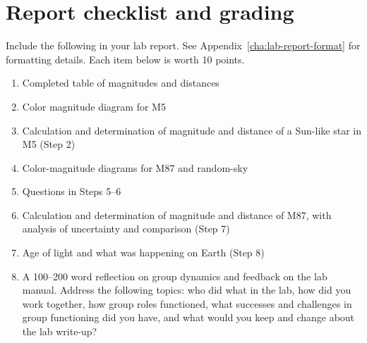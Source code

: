 \section{Report checklist and grading}

Include the following in your lab report. See Appendix~\ref{cha:lab-report-format} for formatting details. Each item below is worth 10 points.

\begin{enumerate}
	\item Completed table of magnitudes and distances
	
	\item Color magnitude diagram for M5
	
	\item Calculation and determination of magnitude and distance of a Sun-like star in M5 (Step 2)

	\item Color-magnitude diagrams for M87 and random-sky
	
	\item Questions in Steps 5--6
	
	\item Calculation and determination of magnitude and distance of M87, with analysis of uncertainty and comparison (Step 7)
	
	\item Age of light and what was happening on Earth (Step 8)
	
	\item A 100--200 word reflection on group dynamics and feedback on the lab manual. Address the following topics: who did what in the lab, how did you work together, how group roles functioned, what successes and challenges in group functioning did you have, and what would you keep and change about the lab write-up?
		
\end{enumerate}